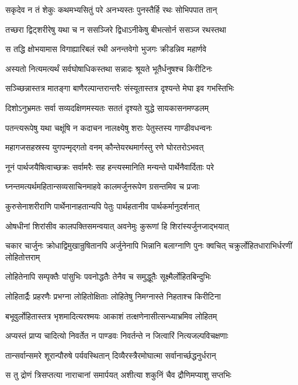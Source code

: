 \twolineshloka
{सकृदेव न तं शेकुः कथमभ्यसितुं परे}
{अनभ्यस्तः पुनस्तैर्हि रथः सोभिपपात तान्}


\twolineshloka
{तच्छरा द्विट्शरीरेषु यथा च न ससञ्जिरे}
{द्विधाऽनीकेषु बीभत्सोर्न ससञ्ज रथस्तथा}


\twolineshloka
{स तद्धि क्षोभयामास विगाह्यारिबलं रथी}
{अनन्तवेगो भुजगः क्रीडन्निव महार्णवे}


\twolineshloka
{अस्यतो नित्यमत्यर्थं सर्वघोषाधिकस्तथा}
{सन्नादः श्रूयते भूतैर्धनुषश्च किरीटिनः}


\twolineshloka
{सञ्च्छिन्नास्तत्र मातङ्गा बाणैरल्पान्तरान्तरैः}
{संस्यूतास्तत्र दृश्यन्ते मेघा इव गभस्तिभिः}


\twolineshloka
{दिशोऽनुभ्रमतः सर्वा सव्यदक्षिणमस्यतः}
{सततं दृश्यते युद्धे सायकासनमण्डलम्}


\twolineshloka
{पतन्त्यरूपेषु यथा चक्षूंषि न कदाचन}
{नालक्ष्येषु शराः पेतुस्तस्य गाण्डीवधन्वनः}


\twolineshloka
{महागजसहस्रस्य युगपन्मृद्गतो वनम्}
{कौन्तेयरथमार्गस्तु रणे घोरतरोऽभवत्}


\twolineshloka
{नूनं पार्थजयैषित्वाच्छक्रः सर्वामरैः सह}
{हन्त्यस्मानिति मन्यन्ते पार्थेनैवार्दिताः परे}


\twolineshloka
{घ्नन्तमत्यर्थमहितान्सव्यसाचिनमाहवे}
{कालमर्जुनरूपेण ग्रसन्तमिव च प्रजाः}


\twolineshloka
{कुरुसेनाशरीराणि पार्थेनानाहतान्यपि}
{पेतुः पार्थहतानीव पार्थकर्मानुदर्शनात्}


\twolineshloka
{ओषधीनां शिरांसीव कालपक्तिसमन्वयात्}
{अवनेमुः कुरूणां हि शिरांस्यर्जुनजाद्भयात्}


\onelineshloka
{चकार चार्जुनः क्रोधाद्विमुखान्रुषितानपि}
\twolineshloka
{अर्जुनेनापि भिन्नानि बलाग्नाणि पुनः क्वचित्}
{चक्रुर्लोहितधाराभिर्धरणीं लोहितोत्तराम्}


\twolineshloka
{लोहितेनापि सम्पृक्तैः पांसुभिः पवनोद्धतैः}
{तेनैव च समुद्धूतैः सूक्ष्मैर्लोहितबिन्दुभिः}


\twolineshloka
{लोहितार्द्रैः प्रहरणैः प्रभग्ना लोहितोक्षिताः}
{लोहितेषु निमग्नास्ते निहताश्च किरीटिना}


\twolineshloka
{बभूवुर्लोहितास्तत्र भृशमादित्यरश्मयः}
{आकाशं तत्क्षणेनासीत्सन्ध्याभ्रमिव लोहितम्}


\twolineshloka
{अप्यस्तं प्राप्य चादित्यो निवर्तेत न पाण्डवः}
{निवर्तन्ते न जित्वारिं नित्यजल्पविचक्षणाः}


\twolineshloka
{तान्सर्वान्समरे शूरान्पौरुषे पर्यवस्थितान्}
{दिव्यैरस्त्रैरमोघात्मा सर्वानार्च्छद्धनुर्धरान्}


\twolineshloka
{स तु द्रोणं त्रिसप्तत्या नाराचानां समार्पयत्}
{अशीत्या शकुनिं चैव द्रौणिमप्याशु सप्तभिः}


